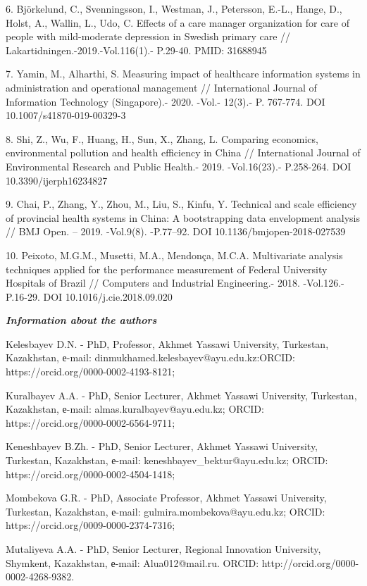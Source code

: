 6. Björkelund, C., Svenningsson, I., Westman, J., Petersson, E.-L.,
Hange, D., Holst, A., Wallin, L., Udo, C. Effects of a care manager
organization for care of people with mild-moderate depression in Swedish
primary care // Lakartidningen.-2019.-Vol.116(1).- P.29-40. PMID:
31688945

7. Yamin, M., Alharthi, S. Measuring impact of healthcare information
systems in administration and operational management // International
Journal of Information Technology (Singapore).- 2020. -Vol.- 12(3).- P.
767-774. DOI 10.1007/s41870-019-00329-3

8. Shi, Z., Wu, F., Huang, H., Sun, X., Zhang, L. Comparing economics,
environmental pollution and health efficiency in China // International
Journal of Environmental Research and Public Health.- 2019.
-Vol.16(23).- P.258-264. DOI 10.3390/ijerph16234827

9. Chai, P., Zhang, Y., Zhou, M., Liu, S., Kinfu, Y. Technical and scale
efficiency of provincial health systems in China: A bootstrapping data
envelopment analysis // BMJ Open. -- 2019. -Vol.9(8). -P.77--92. DOI
10.1136/bmjopen-2018-027539

10. Peixoto, M.G.M., Musetti, M.A., Mendonça, M.C.A. Multivariate
analysis techniques applied for the performance measurement of Federal
University Hospitals of Brazil // Computers and Industrial Engineering.-
2018. -Vol.126.- P.16-29. DOI 10.1016/j.cie.2018.09.020

\emph{{\bfseries Information about the authors}}

Kelesbayev D.N. - PhD, Professor, Akhmet Yassawi University, Turkestan,
Kazakhstan, е-mail: dinmukhamed.kelesbayev@ayu.edu.kz:ORCID:
https://orcid.org/0000-0002-4193-8121;

Kuralbayev A.A. - PhD, Senior Lecturer, Akhmet Yassawi University,
Turkestan, Kazakhstan, е-mail: almas.kuralbayev@ayu.edu.kz; ORCID:
https://orcid.org/0000-0002-6564-9711;

Keneshbayev B.Zh. - PhD, Senior Lecturer, Akhmet Yassawi University,
Turkestan, Kazakhstan, е-mail: keneshbayev\_bektur@ayu.edu.kz; ORCID:
https://orcid.org/0000-0002-4504-1418;

Mombekova G.R. - PhD, Associate Professor, Akhmet Yassawi University,
Turkestan, Kazakhstan, е-mail: gulmira.mombekova@ayu.edu.kz; ORCID:
https://orcid.org/0009-0000-2374-7316;

Mutaliyeva A.A. - PhD, Senior Lecturer, Regional Innovation University,
Shymkent, Kazakhstan, е-mail: Alua012@mail.ru. ORCID:
http://orcid.org/0000-0002-4268-9382.


